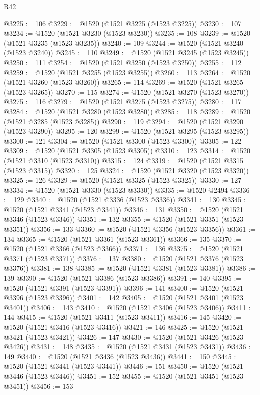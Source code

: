 \begin{lexlean}{R42}
\begin{coremodule}
{@3225 := 106
@3229 := @1520 (@1521 @3225 (@1523 @3225))
@3230 := 107
@3234 := @1520 (@1521 @3230 (@1523 @3230))
@3235 := 108
@3239 := @1520 (@1521 @3235 (@1523 @3235))
@3240 := 109
@3244 := @1520 (@1521 @3240 (@1523 @3240))
@3245 := 110
@3249 := @1520 (@1521 @3245 (@1523 @3245))
@3250 := 111
@3254 := @1520 (@1521 @3250 (@1523 @3250))
@3255 := 112
@3259 := @1520 (@1521 @3255 (@1523 @3255))
@3260 := 113
@3264 := @1520 (@1521 @3260 (@1523 @3260))
@3265 := 114
@3269 := @1520 (@1521 @3265 (@1523 @3265))
@3270 := 115
@3274 := @1520 (@1521 @3270 (@1523 @3270))
@3275 := 116
@3279 := @1520 (@1521 @3275 (@1523 @3275))
@3280 := 117
@3284 := @1520 (@1521 @3280 (@1523 @3280))
@3285 := 118
@3289 := @1520 (@1521 @3285 (@1523 @3285))
@3290 := 119
@3294 := @1520 (@1521 @3290 (@1523 @3290))
@3295 := 120
@3299 := @1520 (@1521 @3295 (@1523 @3295))
@3300 := 121
@3304 := @1520 (@1521 @3300 (@1523 @3300))
@3305 := 122
@3309 := @1520 (@1521 @3305 (@1523 @3305))
@3310 := 123
@3314 := @1520 (@1521 @3310 (@1523 @3310))
@3315 := 124
@3319 := @1520 (@1521 @3315 (@1523 @3315))
@3320 := 125
@3324 := @1520 (@1521 @3320 (@1523 @3320))
@3325 := 126
@3329 := @1520 (@1521 @3325 (@1523 @3325))
@3330 := 127
@3334 := @1520 (@1521 @3330 (@1523 @3330))
@3335 := @1520 @2494
@3336 := 129
@3340 := @1520 (@1521 @3336 (@1523 @3336))
@3341 := 130
@3345 := @1520 (@1521 @3341 (@1523 @3341))
@3346 := 131
@3350 := @1520 (@1521 @3346 (@1523 @3346))
@3351 := 132
@3355 := @1520 (@1521 @3351 (@1523 @3351))
@3356 := 133
@3360 := @1520 (@1521 @3356 (@1523 @3356))
@3361 := 134
@3365 := @1520 (@1521 @3361 (@1523 @3361))
@3366 := 135
@3370 := @1520 (@1521 @3366 (@1523 @3366))
@3371 := 136
@3375 := @1520 (@1521 @3371 (@1523 @3371))
@3376 := 137
@3380 := @1520 (@1521 @3376 (@1523 @3376))
@3381 := 138
@3385 := @1520 (@1521 @3381 (@1523 @3381))
@3386 := 139
@3390 := @1520 (@1521 @3386 (@1523 @3386))
@3391 := 140
@3395 := @1520 (@1521 @3391 (@1523 @3391))
@3396 := 141
@3400 := @1520 (@1521 @3396 (@1523 @3396))
@3401 := 142
@3405 := @1520 (@1521 @3401 (@1523 @3401))
@3406 := 143
@3410 := @1520 (@1521 @3406 (@1523 @3406))
@3411 := 144
@3415 := @1520 (@1521 @3411 (@1523 @3411))
@3416 := 145
@3420 := @1520 (@1521 @3416 (@1523 @3416))
@3421 := 146
@3425 := @1520 (@1521 @3421 (@1523 @3421))
@3426 := 147
@3430 := @1520 (@1521 @3426 (@1523 @3426))
@3431 := 148
@3435 := @1520 (@1521 @3431 (@1523 @3431))
@3436 := 149
@3440 := @1520 (@1521 @3436 (@1523 @3436))
@3441 := 150
@3445 := @1520 (@1521 @3441 (@1523 @3441))
@3446 := 151
@3450 := @1520 (@1521 @3446 (@1523 @3446))
@3451 := 152
@3455 := @1520 (@1521 @3451 (@1523 @3451))
@3456 := 153
}
\end{coremodule}
\end{lexlean}

